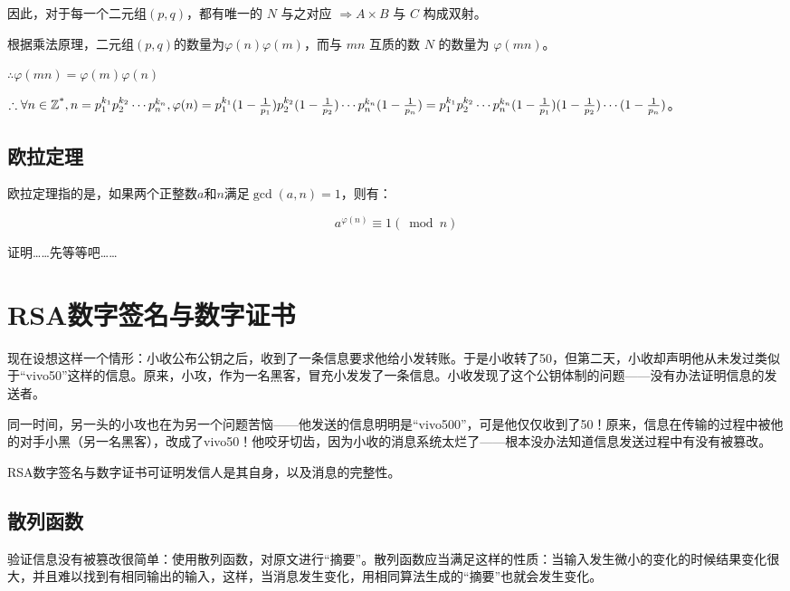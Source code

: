 \documentclass[a4paper]{article}         %
\begin{document}
因此，对于每一个二元组$(p, q)$，都有唯一的 $N$ 与之对应 $\Rightarrow A \times B$ 与 $C$ 构成双射。

根据乘法原理，二元组$(p, q)$的数量为$\varphi(n) \varphi(m)$，而与 $mn$ 互质的数 $N$ 的数量为 $\varphi(mn)$。

$\therefore \varphi(mn) = \varphi(m) \varphi(n)$

$\therefore \forall n \in \mathbb{Z\textsuperscript{*}}, n = p_1^{k_1}p_2^{k_2} \cdots p_n^{k_n}, \varphi(n) = p_1^{k_1}(1 - \frac{1}{p_1})p_2^{k_2}(1 - \frac{1}{p_2})\cdots p_n^{k_n}(1 - \frac{1}{p_n})=p_1^{k_1}p_2^{k_2}\cdots p_n^{k_n}(1 - \frac{1}{p_1})(1 - \frac{1}{p_2})\cdots (1 - \frac{1}{p_n})$。

\subsection{欧拉定理}

欧拉定理指的是，如果两个正整数$a$和$n$满足$\gcd(a, n) = 1$，则有：

\[
	a^{\varphi(n)} \equiv 1 (\bmod n)
\]

证明……先等等吧……

\section{RSA数字签名与数字证书}

现在设想这样一个情形：小收公布公钥之后，收到了一条信息要求他给小发转账。于是小收转了50，但第二天，小收却声明他从未发过类似于“vivo50”这样的信息。原来，小攻，作为一名黑客，冒充小发发了一条信息。小收发现了这个公钥体制的问题——没有办法证明信息的发送者。

同一时间，另一头的小攻也在为另一个问题苦恼——他发送的信息明明是“vivo500”，可是他仅仅收到了50！原来，信息在传输的过程中被他的对手小黑（另一名黑客），改成了vivo50！他咬牙切齿，因为小收的消息系统太烂了——根本没办法知道信息发送过程中有没有被篡改。

RSA数字签名与数字证书可证明发信人是其自身，以及消息的完整性。

\subsection{散列函数} \label{散列函数}

验证信息没有被篡改很简单：使用散列函数，对原文进行“摘要”。散列函数应当满足这样的性质：当输入发生微小的变化的时候结果变化很大，并且难以找到有相同输出的输入，这样，当消息发生变化，用相同算法生成的“摘要”也就会发生变化。
\end{document}
